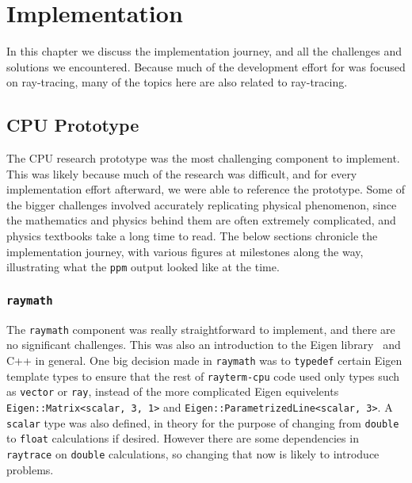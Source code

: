 %
%
%
\chapter{Implementation}\label{ch:implementation}

In this chapter we discuss the implementation journey, and all the challenges and solutions we encountered.
Because much of the development effort for \name{} was focused on ray-tracing, many of the topics here are also related to ray-tracing.

\section{CPU Prototype}\label{ch:implementation:prototype}

The CPU research prototype was the most challenging component to implement.
This was likely because much of the research was difficult, and for every implementation effort afterward, we were able to reference the prototype.
Some of the bigger challenges involved accurately replicating physical phenomenon, since the mathematics and physics behind them are often extremely complicated, and physics textbooks take a long time to read.
The below sections chronicle the implementation journey, with various figures at milestones along the way, illustrating what the \texttt{ppm} output looked like at the time.


\subsection{\texttt{raymath}}\label{ch:implementation:prototype:raymath}

The \texttt{raymath} component was really straightforward to implement, and there are no significant challenges.
This was also an introduction to the Eigen library~\cite{eigenweb} and C++ in general.
One big decision made in \texttt{raymath} was to \texttt{typedef} certain Eigen template types to ensure that the rest of \texttt{rayterm-cpu} code used only types such as \texttt{vector} or \texttt{ray}, instead of the more complicated Eigen equivelents \texttt{Eigen::Matrix<scalar, 3, 1>} and \texttt{Eigen::ParametrizedLine<scalar, 3>}.
A \texttt{scalar} type was also defined, in theory for the purpose of changing from \texttt{double} to \texttt{float} calculations if desired.
However there are some dependencies in \texttt{raytrace} on \texttt{double} calculations, so changing that now is likely to introduce problems.

